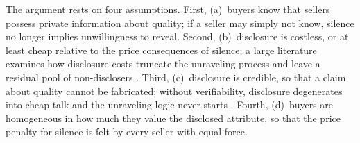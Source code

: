 The argument rests on four assumptions. First, (a)~buyers know
that sellers possess private information about quality; if a seller may simply not know, silence
no longer implies unwillingness to reveal. Second, (b)~disclosure is costless, or at least cheap
relative to the price consequences of silence; a large literature examines how disclosure costs
truncate the unraveling process and leave a residual pool of non-disclosers
\citep{verrecchia_1983, jovanovic_1982}. Third, (c)~disclosure is credible, so that a claim about
quality cannot be fabricated; without verifiability, disclosure degenerates into cheap talk and
the unraveling logic never starts \citep{crawford_sobel_1982, stocken_credibility_2000}. Fourth, (d)~buyers are homogeneous in how much they value the
disclosed attribute, so that the price penalty for silence is felt by every seller with equal
force.
